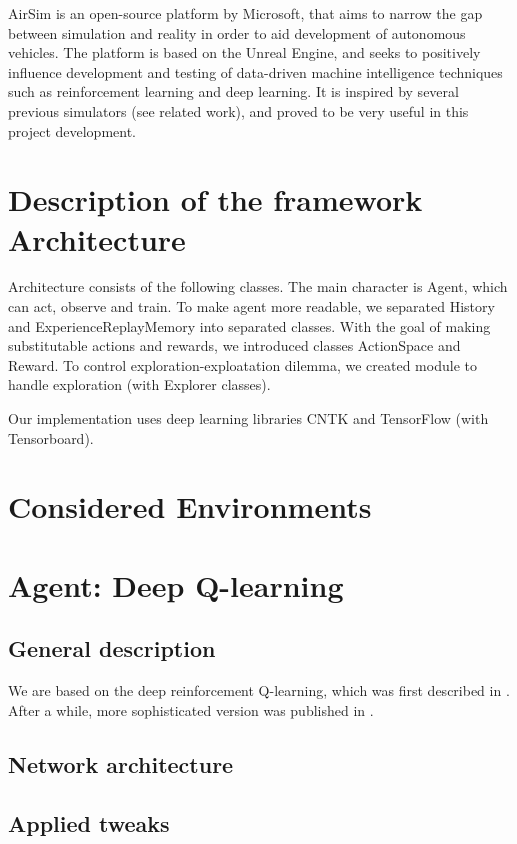 \documentclass{article}
\begin{document}
AirSim  is  an  open-source  platform \cite{airsim2017fsr} by Microsoft, 
that  aims  to  narrow  the  gap  between
simulation  and  reality  in  order  to  aid  development  of  autonomous  vehicles.  
The platform is based on the Unreal Engine, and seeks to positively 
influence development and testing of data-driven
machine intelligence techniques such as reinforcement learning and 
deep learning. It is inspired by several previous simulators (see 
related work), and proved to be very useful in this project development.

\section{Description of the framework Architecture}

Architecture consists of the following classes. The main character is Agent, which can act, observe and train.
To make agent more readable, we separated History and ExperienceReplayMemory into separated classes.
With the goal of making substitutable actions and rewards, we introduced classes ActionSpace and Reward.
To control exploration-exploatation dilemma, we created module to handle exploration (with Explorer classes).

Our implementation uses deep learning libraries CNTK and TensorFlow (with Tensorboard).

\section{Considered Environments}

\section{Agent: Deep Q-learning}

\subsection{General description} We are based on the deep reinforcement
Q-learning, which was first described in \cite{mnih2013playing}.
After a while, more sophisticated version was published in 
\cite{mnih2015humanlevel}.

\subsection{Network architecture}

\subsection{Applied tweaks}
\end{document}
